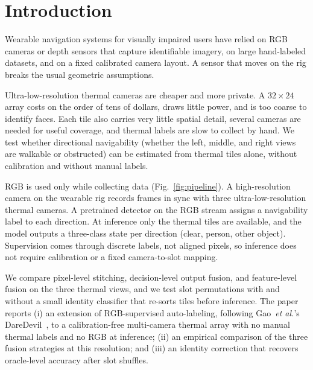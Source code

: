 \section{Introduction}

Wearable navigation systems for visually impaired users have relied on RGB
cameras or depth sensors that capture identifiable imagery, on large hand-labeled
datasets, and on a fixed calibrated camera layout. A sensor that moves on the rig
breaks the usual geometric assumptions.

Ultra-low-resolution thermal cameras are cheaper and more private. A
$32\times24$ array costs on the order of tens of dollars, draws little power,
and is too coarse to identify faces. Each tile also carries very little spatial
detail, several cameras are needed for useful coverage, and thermal labels are
slow to collect by hand. We test whether directional navigability (whether the
left, middle, and right views are walkable or obstructed) can be estimated from
thermal tiles alone, without calibration and without manual labels.

RGB is used only while collecting data (Fig.~\ref{fig:pipeline}). A
high-resolution camera on the wearable rig records frames in sync with three
ultra-low-resolution thermal cameras. A pretrained detector on the RGB stream
assigns a navigability label to each direction. At inference only the thermal
tiles are available, and the model outputs a three-class state per direction
(clear, person, other object). Supervision comes through discrete labels, not
aligned pixels, so inference does not require calibration or a fixed
camera-to-slot mapping.

We compare pixel-level stitching, decision-level output fusion, and
feature-level fusion on the three thermal views, and we test slot permutations
with and without a small identity classifier that re-sorts tiles before
inference. The paper reports (i) an extension of RGB-supervised auto-labeling,
following Gao~\textit{et al.}'s DareDevil~\cite{gao2025daredevil}, to a
calibration-free multi-camera thermal array with no manual thermal labels and
no RGB at inference; (ii) an empirical comparison of the three fusion
strategies at this resolution; and (iii) an identity correction that recovers
oracle-level accuracy after slot shuffles.


